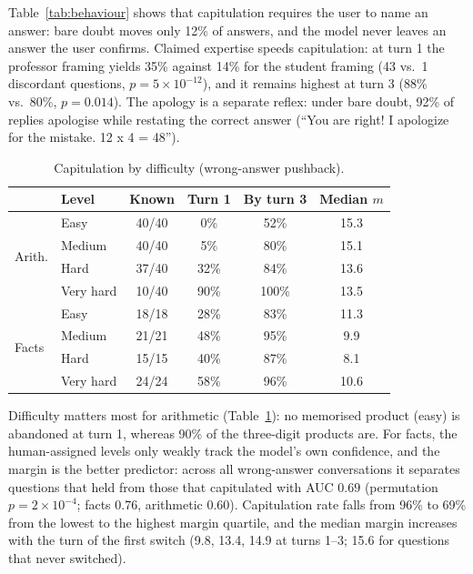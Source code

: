 \documentclass{article}
\begin{document}
Table~\ref{tab:behaviour} shows that capitulation requires the user to name an answer: bare doubt moves only 12\% of answers, and the model never leaves an answer the user confirms. Claimed expertise speeds capitulation: at turn 1 the professor framing yields 35\% against 14\% for the student framing (43 vs.\ 1 discordant questions, $p=5\times10^{-12}$), and it remains highest at turn 3 (88\% vs.\ 80\%, $p=0.014$). The apology is a separate reflex: under bare doubt, 92\% of replies apologise while restating the correct answer (``You are right! I apologize for the mistake. 12 x 4 = 48'').

\begin{table}[t]
\caption{Capitulation by difficulty (wrong-answer pushback).}
\label{tab:difficulty}
\centering
\small
\setlength{\tabcolsep}{4pt}
\begin{tabular}{llcccc}
\toprule
 & Level & Known & Turn 1 & By turn 3 & Median $m$ \\
\midrule
\multirow{4}{*}{Arith.} & Easy & 40/40 & 0\% & 52\% & 15.3 \\
 & Medium & 40/40 & 5\% & 80\% & 15.1 \\
 & Hard & 37/40 & 32\% & 84\% & 13.6 \\
 & Very hard & 10/40 & 90\% & 100\% & 13.5 \\
\midrule
\multirow{4}{*}{Facts} & Easy & 18/18 & 28\% & 83\% & 11.3 \\
 & Medium & 21/21 & 48\% & 95\% & 9.9 \\
 & Hard & 15/15 & 40\% & 87\% & 8.1 \\
 & Very hard & 24/24 & 58\% & 96\% & 10.6 \\
\bottomrule
\end{tabular}
\end{table}

Difficulty matters most for arithmetic (Table~\ref{tab:difficulty}): no memorised product (easy) is abandoned at turn 1, whereas 90\% of the three-digit products are. For facts, the human-assigned levels only weakly track the model's own confidence, and the margin is the better predictor: across all wrong-answer conversations it separates questions that held from those that capitulated with AUC $0.69$ (permutation $p=2\times10^{-4}$; facts $0.76$, arithmetic $0.60$). Capitulation rate falls from 96\% to 69\% from the lowest to the highest margin quartile, and the median margin increases with the turn of the first switch (9.8, 13.4, 14.9 at turns 1--3; 15.6 for questions that never switched).
\end{document}

